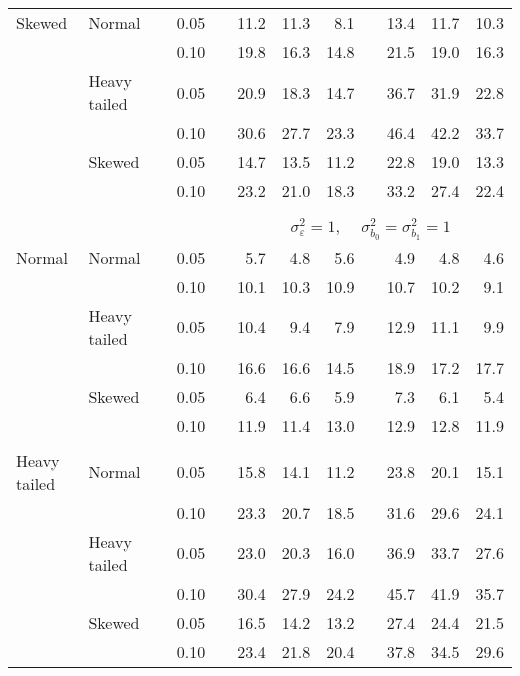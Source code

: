 \begin{table}[ht]
\begin{scriptsize}
\begin{center}
\begin{tabular}{ll p{.1cm} c p{.1cm} rrr p{.1cm} rrr}
Skewed       & Normal       && 0.05 &&   11.2 & 11.3 & 8.1 &   & 13.4 & 11.7 & 10.3 \\ 
             &              && 0.10 &&   19.8 & 16.3 & 14.8 &   & 21.5 & 19.0 & 16.3 \\ 
             & Heavy tailed && 0.05 &&   20.9 & 18.3 & 14.7 &   & 36.7 & 31.9 & 22.8 \\ 
             &              && 0.10 &&   30.6 & 27.7 & 23.3 &   & 46.4 & 42.2 & 33.7 \\ 
             & Skewed       && 0.05 &&   14.7 & 13.5 & 11.2 &   & 22.8 & 19.0 & 13.3 \\ 
             &              && 0.10 &&   23.2 & 21.0 & 18.3 &   & 33.2 & 27.4 & 22.4 \\ 

&&&&&&&&&&&\\
& && && \multicolumn{7}{c}{$\sigma_{\varepsilon}^2 = 1$, \ \ $\sigma_{b_0}^2 = \sigma_{b_1}^2 = 1$} \\ \cline{6-12}
\rowcolor{gray!20}Normal       & Normal       && 0.05 &&   5.7 & 4.8 & 5.6 &   & 4.9 & 4.8 & 4.6 \\ 
\rowcolor{gray!20}             &              && 0.10 &&   10.1 & 10.3 & 10.9 &   & 10.7 & 10.2 & 9.1 \\ 
\rowcolor{gray!20}             & Heavy tailed && 0.05 &&   10.4 & 9.4 & 7.9 &   & 12.9 & 11.1 & 9.9 \\ 
\rowcolor{gray!20}             &              && 0.10 &&   16.6 & 16.6 & 14.5 &   & 18.9 & 17.2 & 17.7 \\ 
\rowcolor{gray!20}             & Skewed       && 0.05 &&   6.4 & 6.6 & 5.9 &   & 7.3 & 6.1 & 5.4 \\ 
\rowcolor{gray!20}             &              && 0.10 &&   11.9 & 11.4 & 13.0 &   & 12.9 & 12.8 & 11.9 \\ 
&&&&&&&&&&&\\
Heavy tailed & Normal       && 0.05 &&   15.8 & 14.1 & 11.2 &   & 23.8 & 20.1 & 15.1 \\ 
             &              && 0.10 &&   23.3 & 20.7 & 18.5 &   & 31.6 & 29.6 & 24.1 \\ 
             & Heavy tailed && 0.05 &&   23.0 & 20.3 & 16.0 &   & 36.9 & 33.7 & 27.6 \\ 
             &              && 0.10 &&   30.4 & 27.9 & 24.2 &   & 45.7 & 41.9 & 35.7 \\ 
             & Skewed       && 0.05 &&   16.5 & 14.2 & 13.2 &   & 27.4 & 24.4 & 21.5 \\ 
             &              && 0.10 &&   23.4 & 21.8 & 20.4 &   & 37.8 & 34.5 & 29.6 \\ 

\end{tabular}
\end{center}
\end{scriptsize}
\end{table}

